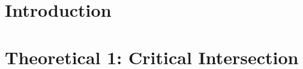 \documentclass[11pt,a4paper]{article}
\theoremstyle{plain}
\theoremstyle{definition}
\theoremstyle{remark}
\numberwithin{equation}{section}
\begin{document}

\clearpage\maketitle
\thispagestyle{empty}
\clearpage\newpage
\thispagestyle{plain}


\section*{Introduction}




\section*{Theoretical 1: Critical Intersection}
\end{document}
